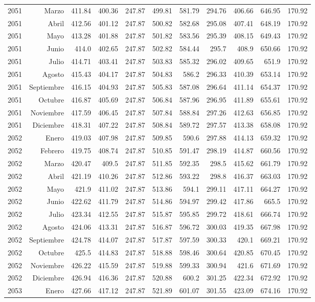 \documentclass{article}%
\begin{document}
\begin{longtable}{|l r|r|r|r|r|r|r|r|r|r|}
2051&Marzo&411.84&400.36&247.87&499.81&581.79&294.76&406.66&646.95&170.92\\%
2051&Abril&412.56&401.12&247.87&500.82&582.68&295.08&407.41&648.19&170.92\\%
2051&Mayo&413.28&401.88&247.87&501.82&583.56&295.39&408.15&649.43&170.92\\%
2051&Junio&414.0&402.65&247.87&502.82&584.44&295.7&408.9&650.66&170.92\\%
2051&Julio&414.71&403.41&247.87&503.83&585.32&296.02&409.65&651.9&170.92\\%
2051&Agosto&415.43&404.17&247.87&504.83&586.2&296.33&410.39&653.14&170.92\\%
2051&Septiembre&416.15&404.93&247.87&505.83&587.08&296.64&411.14&654.37&170.92\\%
2051&Octubre&416.87&405.69&247.87&506.84&587.96&296.95&411.89&655.61&170.92\\%
2051&Noviembre&417.59&406.45&247.87&507.84&588.84&297.26&412.63&656.85&170.92\\%
2051&Diciembre&418.31&407.22&247.87&508.84&589.72&297.57&413.38&658.08&170.92\\%
2052&Enero&419.03&407.98&247.87&509.85&590.6&297.88&414.13&659.32&170.92\\%
2052&Febrero&419.75&408.74&247.87&510.85&591.47&298.19&414.87&660.56&170.92\\%
2052&Marzo&420.47&409.5&247.87&511.85&592.35&298.5&415.62&661.79&170.92\\%
2052&Abril&421.19&410.26&247.87&512.86&593.22&298.8&416.37&663.03&170.92\\%
2052&Mayo&421.9&411.02&247.87&513.86&594.1&299.11&417.11&664.27&170.92\\%
2052&Junio&422.62&411.79&247.87&514.86&594.97&299.42&417.86&665.5&170.92\\%
2052&Julio&423.34&412.55&247.87&515.87&595.85&299.72&418.61&666.74&170.92\\%
2052&Agosto&424.06&413.31&247.87&516.87&596.72&300.03&419.35&667.98&170.92\\%
2052&Septiembre&424.78&414.07&247.87&517.87&597.59&300.33&420.1&669.21&170.92\\%
2052&Octubre&425.5&414.83&247.87&518.88&598.46&300.64&420.85&670.45&170.92\\%
2052&Noviembre&426.22&415.59&247.87&519.88&599.33&300.94&421.6&671.69&170.92\\%
2052&Diciembre&426.94&416.36&247.87&520.88&600.2&301.25&422.34&672.92&170.92\\%
2053&Enero&427.66&417.12&247.87&521.89&601.07&301.55&423.09&674.16&170.92\\%

\end{longtable}
\end{document}
